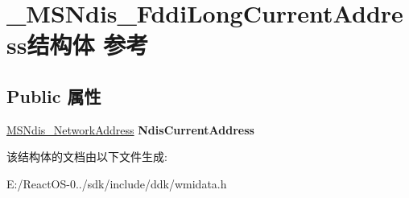 \hypertarget{struct___m_s_ndis___fddi_long_current_address}{}\section{\+\_\+\+M\+S\+Ndis\+\_\+\+Fddi\+Long\+Current\+Address结构体 参考}
\label{struct___m_s_ndis___fddi_long_current_address}
\subsection*{Public 属性}
\begin{DoxyCompactItemize}
\item 
\mbox{\label{struct___m_s_ndis___fddi_long_current_address_ac0b3a1b2541b91608237d85fcd82d3f4}} 
\hyperlink{struct___m_s_ndis___network_address}{M\+S\+Ndis\+\_\+\+Network\+Address} {\bfseries Ndis\+Current\+Address}
\end{DoxyCompactItemize}


该结构体的文档由以下文件生成\+:\begin{DoxyCompactItemize}
\item 
E\+:/\+React\+O\+S-\/0../sdk/include/ddk/wmidata.\+h\end{DoxyCompactItemize}
